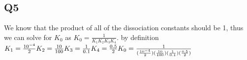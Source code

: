 \documentclass[12pt]{article}
\begin{document}
\subsection{Q5}
We know that the product of all of the dissociation constants should be 1, thus we can solve for $K_0$ as $K_0 = \frac{1}{K_1K_2K_3K_4}.$ by definition\\
$
K_1 = \frac{10^{-4}}{2}\\
K_2 = \frac{10}{100}\\
K_3 = \frac{1}{0.1}\\
K_4 = \frac{0.5}{2}\\
K_0 = \frac{1}{(\frac{10^{-4}}{2})(\frac{10}{100})(\frac{1}{0.1})(\frac{0.5}{2})}\\
$
\end{document}
